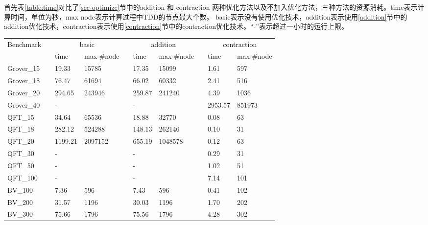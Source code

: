 首先表\ref{table:time}对比了\ref{sec-optimize}节中的addition 和 contraction 两种优化方法以及不加入优化方法，三种方法的资源消耗。time表示计算时间，单位为秒，max node表示计算过程中TDD的节点最大个数。
basic表示没有使用优化技术，addition表示使用\ref{addition}节中的addition优化技术，contraction表示使用\ref{contraction}节中的contraction优化技术。“-”表示超过一小时的运行上限。
\begin{table}[!htbp]
    \centering
    \begin{tabular}{llllllllll}
        \hline
        \multirow{2}{*}{Benchmark} &  & \multicolumn{2}{c}{basic} &  & \multicolumn{2}{c}{addition} &  & \multicolumn{2}{c}{contraction} \\ \cline{3-4} \cline{6-7} \cline{9-10} 
                                   &  & time        & max \#node       &  & time          & max \#node        &  & time           & max \#node          \\ \hline
        Grover\_15 &   & 19.33  & 15785     &   & 17.35      & 15099  & & 1.61 & 597  \\
        Grover\_18 &   & 76.47  & 61694     &   & 66.02      & 60332  & & 2.41 & 516  \\
        Grover\_20 &   & 294.65 & 243946    &   & 259.87     & 241240 & & 4.39  & 1036 \\ 
        Grover\_40 &   & -      &           &   & -          &        & & 2953.57 & 851973 \\
        \hline
        QFT\_15     &  & 34.64   & 65536   &  & 18.88  & 32770   &  & 0.08 & 63  \\
        QFT\_18     &  & 282.12  & 524288  &  & 148.13 & 262146 &   & 0.10  & 31  \\
        QFT\_20     &  & 1199.21 & 2097152 &  & 655.19 & 1048578 &  & 0.12 & 63  \\
        QFT\_30     &  & -       &         &  & -      &        &  & 0.29 & 31  \\
        QFT\_50     &  & -       &         &  & -      &        &  & 1.02 & 51  \\
        QFT\_100    &  & -       &         &  & -      &        &  & 7.14 & 101 \\
        \hline
        BV\_100     &  & 7.36    & 596     &  & 7.43      & 596     &  & 0.41           & 102 \\
        BV\_200     &  & 31.57   & 1196    &  & 30.03     & 1196    &  & 1.70           & 202 \\
        BV\_300     &  & 75.66   & 1796    &  & 75.56     & 1796    &  & 4.28           & 302 \\

\end{tabular}
\end{table}
